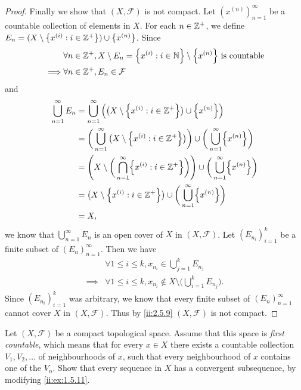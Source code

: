 \begin{proof}
  Finally we show that \((X, \mathcal{F})\) is not compact.
  Let \((x^{(n)})_{n = 1}^\infty\) be a countable collection of elements in \(X\).
  For each \(n \in \mathbb{Z}^+\), we define \(E_n = (X \setminus \left\lbrace x^{(i)} : i \in \mathbb{Z}^+\right\rbrace) \cup \left\lbrace x^{(n)}\right\rbrace\).
  Since
  \begin{align*}
             & \forall n \in \Z^+, X \setminus E_n = \set{x^{(i)} : i \in \N} \setminus \set{x^{(n)}} \text{ is countable} \\
    \implies & \forall n \in \Z^+, E_n \in \mathcal{F}
  \end{align*}
  and
  \begin{align*}
    \bigcup_{n = 1}^\infty E_n & = \bigcup_{n = 1}^\infty \Big(\big(X \setminus \set{x^{(i)} : i \in \Z^+}\big) \cup \set{x^{(n)}}\Big)                                        \\
                               & = \bigg(\bigcup_{n = 1}^\infty \big(X \setminus \set{x^{(i)} : i \in \Z^+}\big)\bigg) \cup \bigg(\bigcup_{n = 1}^\infty \set{x^{(n)}}\bigg)   \\
                               & = \Bigg(X \setminus \bigg(\bigcap_{n = 1}^\infty \set{x^{(i)} : i \in \Z^+}\bigg)\Bigg) \cup \bigg(\bigcup_{n = 1}^\infty \set{x^{(n)}}\bigg) \\
                               & = \big(X \setminus \set{x^{(i)} : i \in \Z^+}\big) \cup \bigg(\bigcup_{n = 1}^\infty \set{x^{(n)}}\bigg)                                      \\
                               & = X,
  \end{align*}
  we know that \(\bigcup_{n = 1}^\infty E_n\) is an open cover of \(X\) in \((X, \mathcal{F})\).
  Let \((E_{n_i})_{i = 1}^k\) be a finite subset of \((E_n)_{n = 1}^\infty\).
  Then we have
  \begin{align*}
             & \forall 1 \leq i \leq k, x_{n_i} \in \bigcup_{j = 1}^k E_{n_j}                             \\
    \implies & \forall 1 \leq i \leq k, x_{n_i} \notin X \setminus \bigg(\bigcup_{i = 1}^k E_{n_j}\bigg).
  \end{align*}
  Since \((E_{n_i})_{i = 1}^k\) was arbitrary, we know that every finite subset of \((E_n)_{n = 1}^\infty\) cannot cover \(X\) in \((X, \mathcal{F})\).
  Thus by \cref{ii:2.5.9} \((X, \mathcal{F})\) is not compact.
\end{proof}

\setcounter{ex}{8}
\begin{ex}\label{ii:ex:2.5.9}
  Let \((X, \mathcal{F})\) be a compact topological space.
  Assume that this space is \emph{first countable}, which means that for every \(x \in X\) there exists a countable collection \(V_1 , V_2 , \dots\) of neighbourhoods of \(x\), such that every neighbourhood of \(x\) contains one of the \(V_n\).
  Show that every sequence in \(X\) has a convergent subsequence, by modifying \cref{ii:ex:1.5.11}.
\end{ex}

